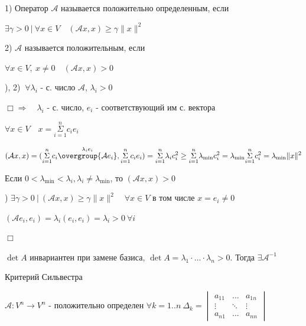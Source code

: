\documentclass[12pt]{article}
\begin{document}
    1) Оператор $\mathcal{A}$ называется положительно определенным, если

    $\displaystyle \exists \gamma > 0 \ | \ \forall x \in V \quad (\mathcal{A}x, x) \geq \gamma \|x\|^2$

    2) $\mathcal{A}$ называется положительным, если

    $\forall x \in V, \ x \neq 0 \quad (\mathcal{A}x, x) > 0$

    ), 2) \Longleftrightarrow $\displaystyle \ \forall \lambda_i$ - с. число $\mathcal{A}$, $\displaystyle \lambda_i > 0$

    $\displaystyle \Box \Longrightarrow \quad \lambda_i$ - с. число, $\displaystyle e_i$ - соответствующий им с. вектора

    $\displaystyle \forall x \in V \quad x = \overset{n}{\underset{i = 1}{\Sigma}} c_i e_i$

    $\displaystyle (\mathcal{A}x, x) = (\overset{n}{\underset{i = 1}{\Sigma}} c_i \overset{\lambda_i e_i}{\overgroup{\mathcal{A}e_i}}, \overset{n}{\underset{i = 1}{\Sigma}} c_i e_i) =
    \overset{n}{\underset{i = 1}{\Sigma}} \lambda_i c_i^2 \geq \overset{n}{\underset{i = 1}{\Sigma}}\lambda_{\min} c_i^2 =
    \lambda_{\min} \overset{n}{\underset{i = 1}{\Sigma}}c_i^2 = \lambda_{\min} \|x\|^2$

    Если $\displaystyle 0 < \lambda_{\min} < \lambda_i, \lambda_i \neq \lambda_{\min}$, то $(\mathcal{A}x, x) > 0$

    \Longleftarrow {}) \Longleftrightarrow $\displaystyle \exists \gamma > 0 \ | \ (\mathcal{A}x, x) \geq \gamma \|x\|^2 \quad \forall x \in V$ в том числе $\displaystyle x = e_i \neq 0$

    $\displaystyle (\mathcal{A}e_i, e_i) = \lambda_i (e_i, e_i) = \lambda_i > 0 \ \forall i$

    $\Box$

    \Nota $\det A$ инвариантен при замене базиса, $\displaystyle \det A = \lambda_1 \cdot \dots \cdot \lambda_n > 0$. Тогда $\displaystyle \exists \mathcal{A}^{-1}$

    \Th Критерий Сильвестра

    $\displaystyle \mathcal{A}: V^n \to V^n$ - положительно определен \Longleftrightarrow $\displaystyle \forall k = 1..n \ \Delta_k =
    \begin{vmatrix}a_{11} & \dots & a_{1n} \\ \vdots & \ddots & \vdots \\ a_{n1} & \dots & a_{nn}\end{vmatrix}$
\end{document}
